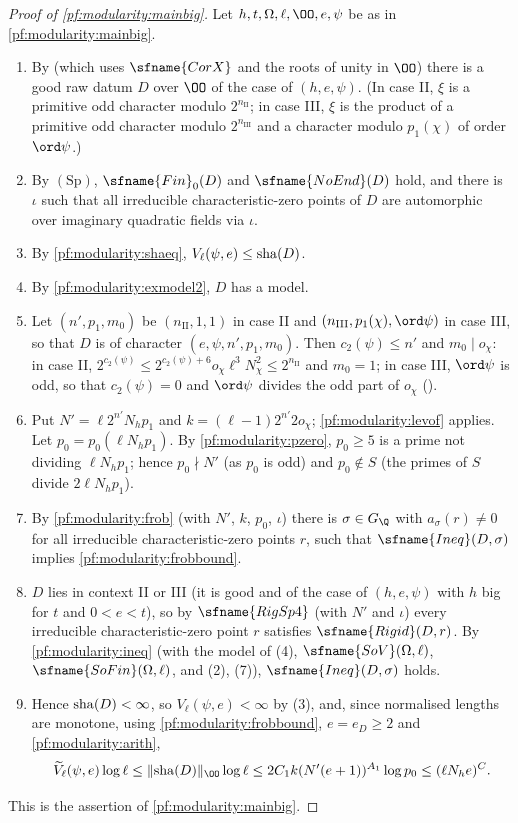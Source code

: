 \begin{proof}[Proof of \cref{pf:modularity:mainbig}]
Let $h,t,\Omega,\ell,\OO,e,\psi$ be as in \cref{pf:modularity:mainbig}.
\begin{enumerate}[label=(\arabic*)]
\item By  (which uses $\sfname{CorX}$ and the roots of
unity in $\OO$) there is a good raw datum $D$ over $\OO$ of the case of $(h,e,\psi)$. (In case II, $\xi$ is a primitive
odd character modulo $2^{n_{\mathrm{II}}}$; in case III, $\xi$ is the product of a primitive odd character modulo
$2^{n_{\mathrm{III}}}$ and a character modulo $p_1(\chi)$ of order $\ord\psi$.)
\item By $(\mathrm{Sp})$, $\sfname{Fin}_0(D)$ and $\sfname{NoEnd}(D)$ hold, and there is $\iota$ such that all irreducible
characteristic-zero points of $D$ are automorphic over imaginary quadratic fields via $\iota$.
\item By \cref{pf:modularity:shaeq}, $V_\ell(\psi,e)\le\mathrm{sha}(D)$.
\item By \cref{pf:modularity:exmodel2}, $D$ has a model.
\item Let $(n',p_1,m_0)$ be $(n_{\mathrm{II}},1,1)$ in case II and $(n_{\mathrm{III}},p_1(\chi),\ord\psi)$ in case III,
so that $D$ is of character $(e,\psi,n',p_1,m_0)$. Then $c_2(\psi)\le n'$ and $m_0\mid o_\chi$: in case II,
$2^{c_2(\psi)}\le2^{c_2(\psi)+6}o_\chi\ell^3N_\chi^2\le2^{n_{\mathrm{II}}}$ and $m_0=1$; in case III, $\ord\psi$ is odd,
so that $c_2(\psi)=0$ and $\ord\psi$ divides the odd part of $o_\chi$ ().
\item Put $N'=\ell2^{n'}N_hp_1$ and $k=(\ell-1)2^{n'}2o_\chi$; \cref{pf:modularity:levof} applies. Let
$p_0=p_0(\ell N_hp_1)$. By \cref{pf:modularity:pzero}, $p_0\ge5$ is a prime not dividing $\ell N_hp_1$; hence
$p_0\nmid N'$ (as $p_0$ is odd) and $p_0\notin S$ (the primes of $S$ divide $2\ell N_hp_1$).
\item By \cref{pf:modularity:frob} (with $N'$, $k$, $p_0$, $\iota$) there is $\sigma\in G_\Q$ with $a_\sigma(r)\ne0$
for all irreducible characteristic-zero points $r$, such that $\sfname{Ineq}(D,\sigma)$ implies
\eqref{pf:modularity:frobbound}.
\item $D$ lies in context II or III (it is good and of the case of $(h,e,\psi)$ with $h$ big for $t$ and $0<e<t$), so by
$\sfname{RigSp4}$ (with $N'$ and $\iota$) every irreducible characteristic-zero point $r$ satisfies $\sfname{Rigid}(D,r)$.
By \cref{pf:modularity:ineq} (with the model of (4), $\sfname{SoV}(\Omega,\ell)$, $\sfname{SoFin}(\Omega,\ell)$, and
(2), (7)), $\sfname{Ineq}(D,\sigma)$ holds.
\item Hence $\mathrm{sha}(D)<\infty$, so $V_\ell(\psi,e)<\infty$ by (3), and, since normalised lengths are monotone,
using \eqref{pf:modularity:frobbound}, $e=e_D\ge2$ and \eqref{pf:modularity:arith},
\[
 \widetilde V_\ell(\psi,e)\log\ell\le\|\modularitySha(D)\|_\OO\log\ell\le2C_1k(N'(e+1))^{A_1}\log p_0\le(\ell N_he)^C.
\]
\end{enumerate}
This is the assertion of \cref{pf:modularity:mainbig}.
\end{proof}

